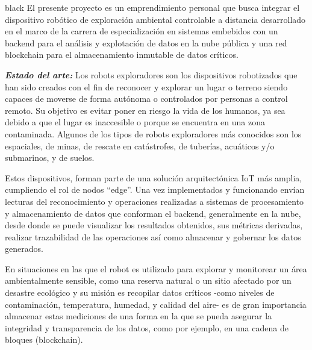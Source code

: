 \documentclass[
11pt, %
]{charter}
\begin{document}
\begin{consigna}{black} %
El presente proyecto es un emprendimiento personal que busca integrar el dispositivo robótico de exploración ambiental controlable a distancia desarrollado en el marco de la carrera de especialización en sistemas embebidos con un backend para el análisis y explotación de datos en la nube pública y una red blockchain para el almacenamiento inmutable de datos críticos.

\textit{\textbf{Estado del arte:}}
Los robots exploradores son los dispositivos robotizados que han sido creados con el fin de reconocer y explorar un lugar o terreno siendo capaces de moverse de forma autónoma o controlados por personas a control remoto. Su objetivo es evitar poner en riesgo la vida de los humanos, ya sea debido a que el lugar es inaccesible o porque se encuentra en una zona contaminada.
Algunos de los tipos de robots exploradores más conocidos son los espaciales, de minas, de rescate en catástrofes, de tuberías, acuáticos y/o submarinos, y de suelos.

Estos dispositivos, forman parte de una solución arquitectónica IoT más amplia, cumpliendo el rol de nodos “edge”.  Una vez implementados y funcionando envían lecturas del reconocimiento y operaciones realizadas a sistemas de procesamiento y almacenamiento de datos que conforman el backend, generalmente en la nube, desde donde se puede visualizar los resultados obtenidos, sus métricas derivadas, realizar trazabilidad de las operaciones así como almacenar y gobernar los datos generados.

En situaciones en las que el robot es utilizado para explorar y monitorear un área ambientalmente sensible, como una reserva natural o un sitio afectado por un desastre ecológico y su misión es recopilar datos críticos -como niveles de contaminación, temperatura, humedad, y calidad del aire- es de gran importancia almacenar estas mediciones de una forma en la que se pueda asegurar la integridad y transparencia de los datos, como por ejemplo, en una cadena de bloques (blockchain).


\end{consigna}
\end{document}
